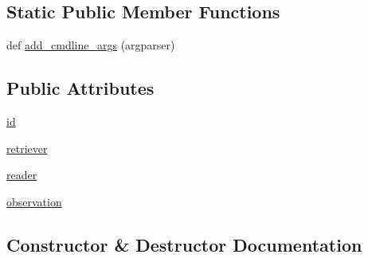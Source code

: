 \subsection*{Static Public Member Functions}
\begin{DoxyCompactItemize}
\item 
def \hyperlink{classparlai_1_1agents_1_1retriever__reader_1_1retriever__reader_1_1RetrieverReaderAgent_aa2c30c066bf3cf8413fd7fbc4d7de0e1}{add\+\_\+cmdline\+\_\+args} (argparser)
\end{DoxyCompactItemize}
\subsection*{Public Attributes}
\begin{DoxyCompactItemize}
\item 
\hyperlink{classparlai_1_1agents_1_1retriever__reader_1_1retriever__reader_1_1RetrieverReaderAgent_ad509b6894625808427a677995488c385}{id}
\item 
\hyperlink{classparlai_1_1agents_1_1retriever__reader_1_1retriever__reader_1_1RetrieverReaderAgent_a5695be3aea22476bb07b09c4a76e5b5d}{retriever}
\item 
\hyperlink{classparlai_1_1agents_1_1retriever__reader_1_1retriever__reader_1_1RetrieverReaderAgent_a5ebf10c780f576b8e6b481a207a3b6ce}{reader}
\item 
\hyperlink{classparlai_1_1agents_1_1retriever__reader_1_1retriever__reader_1_1RetrieverReaderAgent_ab93ead9cf1fcab11b471b9e025b5652c}{observation}
\end{DoxyCompactItemize}


\subsection{Constructor \& Destructor Documentation}
\mbox{\label{classparlai_1_1agents_1_1retriever__reader_1_1retriever__reader_1_1RetrieverReaderAgent_a7777973d732eccc4a630116d8a9462f1}} 
